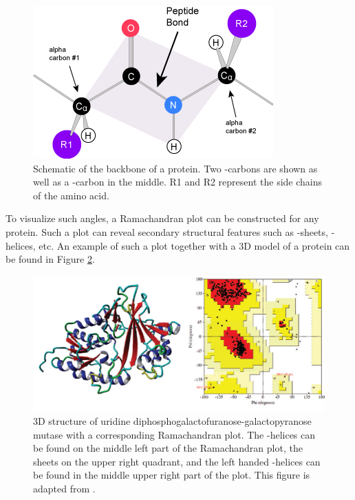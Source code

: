 \begin{figure}[h]
  \centering
  \includegraphics[width=.6\textwidth]{./figures/peptide_bond.png}
  \caption[Schematic of the backbone of a protein.]{Schematic of the backbone of a protein. Two \textalpha{}-carbons are
    shown as well as a \textbeta{}-carbon in the middle. R1 and R2 represent the
    side chains of the amino acid. }
  \label{fig:backbone}
\end{figure}


To visualize such angles, a Ramachandran plot can be constructed for any
protein. Such a plot can reveal secondary structural features such as
\textbeta{}-sheets, \textalpha{}-helices, etc. An example of such a plot together
with a 3D model of a protein can be found in Figure \ref{fig:ramachandran}.

\begin{figure}[h]
  \centering
  \includegraphics[width=.7\textwidth]{./figures/ramachandran_plot.jpg}
  \caption[3D structure of uridine diphosphogalactofuranose-galactopyranose
  mutase with a corresponding Ramachandran plot.]{3D structure of uridine diphosphogalactofuranose-galactopyranose
mutase with a corresponding Ramachandran plot. The \textalpha{}-helices can be
found on the middle left part of the Ramachandran plot, the \textbeta{} sheets on
the upper right quadrant, and the left handed \textalpha{}-helices can be found in
the middle upper right part of the plot. This figure is adapted from
\cite{nayak2018identification}.}
  \label{fig:ramachandran}
\end{figure}

